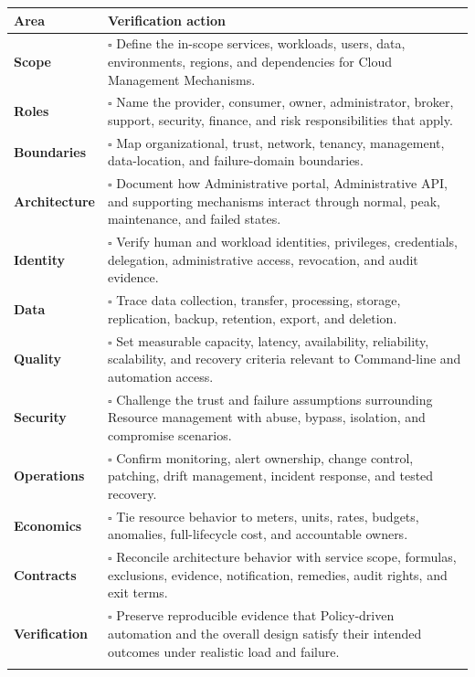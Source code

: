 \documentclass[11pt]{article}
\begin{document}
\begin{longtable}{@{}>{\bfseries\color{Teal}}p{}>{\RaggedRight\arraybackslash}p{}@{}}
\toprule\textbf{Area} & \textbf{Verification action}\\\midrule\endhead
Scope & $\square$ Define the in-scope services, workloads, users, data, environments, regions, and dependencies for Cloud Management Mechanisms. \\\addlinespace[2pt]
Roles & $\square$ Name the provider, consumer, owner, administrator, broker, support, security, finance, and risk responsibilities that apply. \\\addlinespace[2pt]
Boundaries & $\square$ Map organizational, trust, network, tenancy, management, data-location, and failure-domain boundaries. \\\addlinespace[2pt]
Architecture & $\square$ Document how Administrative portal, Administrative API, and supporting mechanisms interact through normal, peak, maintenance, and failed states. \\\addlinespace[2pt]
Identity & $\square$ Verify human and workload identities, privileges, credentials, delegation, administrative access, revocation, and audit evidence. \\\addlinespace[2pt]
Data & $\square$ Trace data collection, transfer, processing, storage, replication, backup, retention, export, and deletion. \\\addlinespace[2pt]
Quality & $\square$ Set measurable capacity, latency, availability, reliability, scalability, and recovery criteria relevant to Command-line and automation access. \\\addlinespace[2pt]
Security & $\square$ Challenge the trust and failure assumptions surrounding Resource management with abuse, bypass, isolation, and compromise scenarios. \\\addlinespace[2pt]
Operations & $\square$ Confirm monitoring, alert ownership, change control, patching, drift management, incident response, and tested recovery. \\\addlinespace[2pt]
Economics & $\square$ Tie resource behavior to meters, units, rates, budgets, anomalies, full-lifecycle cost, and accountable owners. \\\addlinespace[2pt]
Contracts & $\square$ Reconcile architecture behavior with service scope, formulas, exclusions, evidence, notification, remedies, audit rights, and exit terms. \\\addlinespace[2pt]
Verification & $\square$ Preserve reproducible evidence that Policy-driven automation and the overall design satisfy their intended outcomes under realistic load and failure. \\\addlinespace[2pt]
\bottomrule
\end{longtable}
\end{document}
